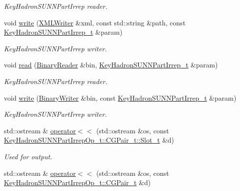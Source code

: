 \begin{DoxyCompactItemize}
\begin{DoxyCompactList}\small\item\em Key\+Hadron\+S\+U\+N\+N\+Part\+Irrep reader. \end{DoxyCompactList}\item 
void \mbox{\hyperlink{namespaceHadron_a4d280edd65eda86698eae0d619c81a47}{write}} (\mbox{\hyperlink{classADATXML_1_1XMLWriter}{X\+M\+L\+Writer}} \&xml, const std\+::string \&path, const \mbox{\hyperlink{structHadron_1_1KeyHadronSUNNPartIrrep__t}{Key\+Hadron\+S\+U\+N\+N\+Part\+Irrep\+\_\+t}} \&param)
\begin{DoxyCompactList}\small\item\em Key\+Hadron\+S\+U\+N\+N\+Part\+Irrep writer. \end{DoxyCompactList}\item 
void \mbox{\hyperlink{namespaceHadron_a067d20ab6ec9071306d6db3a7e7cb4fd}{read}} (\mbox{\hyperlink{classADATIO_1_1BinaryReader}{Binary\+Reader}} \&bin, \mbox{\hyperlink{structHadron_1_1KeyHadronSUNNPartIrrep__t}{Key\+Hadron\+S\+U\+N\+N\+Part\+Irrep\+\_\+t}} \&param)
\begin{DoxyCompactList}\small\item\em Key\+Hadron\+S\+U\+N\+N\+Part\+Irrep reader. \end{DoxyCompactList}\item 
void \mbox{\hyperlink{namespaceHadron_a5a34021fb508d068cf35d125eef2e1b4}{write}} (\mbox{\hyperlink{classADATIO_1_1BinaryWriter}{Binary\+Writer}} \&bin, const \mbox{\hyperlink{structHadron_1_1KeyHadronSUNNPartIrrep__t}{Key\+Hadron\+S\+U\+N\+N\+Part\+Irrep\+\_\+t}} \&param)
\begin{DoxyCompactList}\small\item\em Key\+Hadron\+S\+U\+N\+N\+Part\+Irrep writer. \end{DoxyCompactList}\item 
std\+::ostream \& \mbox{\hyperlink{namespaceHadron_a1efe31b41d734bffbf3ac7a82e8be6b5}{operator$<$$<$}} (std\+::ostream \&os, const \mbox{\hyperlink{structHadron_1_1KeyHadronSUNNPartIrrepOp__t_1_1CGPair__t_1_1Slot__t}{Key\+Hadron\+S\+U\+N\+N\+Part\+Irrep\+Op\+\_\+t\+::\+C\+G\+Pair\+\_\+t\+::\+Slot\+\_\+t}} \&d)
\begin{DoxyCompactList}\small\item\em Used for output. \end{DoxyCompactList}\item 
std\+::ostream \& \mbox{\hyperlink{namespaceHadron_a20c42b7ec1de1c12cf53c8871dcb5a78}{operator$<$$<$}} (std\+::ostream \&os, const \mbox{\hyperlink{structHadron_1_1KeyHadronSUNNPartIrrepOp__t_1_1CGPair__t}{Key\+Hadron\+S\+U\+N\+N\+Part\+Irrep\+Op\+\_\+t\+::\+C\+G\+Pair\+\_\+t}} \&d)

\end{DoxyCompactItemize}
